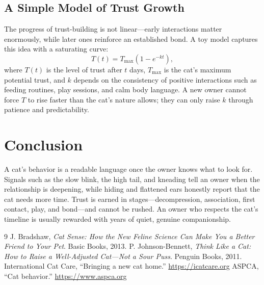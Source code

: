 \documentclass[12pt,a4paper]{article}
\begin{document}
\subsection{A Simple Model of Trust Growth}
The progress of trust-building is not linear---early interactions matter enormously,
while later ones reinforce an established bond. A toy model captures this idea with a
saturating curve:
\begin{equation}
T(t) = T_{\max}\left(1 - e^{-kt}\right),
\label{eq:trust}
\end{equation}
where $T(t)$ is the level of trust after $t$ days, $T_{\max}$ is the cat's maximum
potential trust, and $k$ depends on the consistency of positive interactions such as
feeding routines, play sessions, and calm body language. A new owner cannot force
$T$ to rise faster than the cat's nature allows; they can only raise $k$ through
patience and predictability.

\section{Conclusion}
A cat's behavior is a readable language once the owner knows what to look for. Signals
such as the slow blink, the high tail, and kneading tell an owner when the relationship
is deepening, while hiding and flattened ears honestly report that the cat needs more
time. Trust is earned in stages---decompression, association, first contact, play, and
bond---and cannot be rushed. An owner who respects the cat's timeline is usually
rewarded with years of quiet, genuine companionship.

\begin{thebibliography}{9}
 J. Bradshaw, \emph{Cat Sense: How the New Feline Science Can Make
You a Better Friend to Your Pet}. Basic Books, 2013.
 P. Johnson-Bennett, \emph{Think Like a Cat: How to Raise a
Well-Adjusted Cat---Not a Sour Puss}. Penguin Books, 2011.
 International Cat Care, ``Bringing a new cat home.''
\url{https://icatcare.org}
 ASPCA, ``Cat behavior.'' \url{https://www.aspca.org}
\end{thebibliography}
\end{document}
